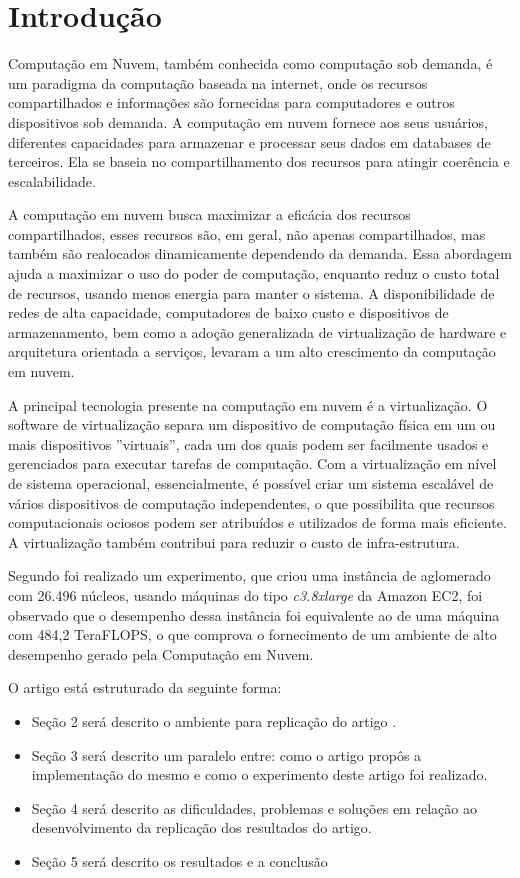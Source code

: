 \section{Introdução}

Computação em Nuvem, também conhecida como computação sob demanda, é um paradigma da computação baseada na internet, onde os recursos compartilhados e informações são fornecidas para computadores e outros dispositivos sob demanda. A computação em nuvem fornece aos seus usuários, diferentes capacidades para armazenar e processar seus dados em databases de terceiros. Ela se baseia no compartilhamento dos recursos para atingir coerência e escalabilidade.

A computação em nuvem busca maximizar a eficácia dos recursos compartilhados, esses recursos são, em geral, não apenas compartilhados, mas também são realocados dinamicamente dependendo da demanda. Essa abordagem ajuda a maximizar o uso do poder de computação, enquanto reduz o custo total de recursos, usando menos energia para manter o sistema. A disponibilidade de redes de alta capacidade, computadores de baixo custo e dispositivos de armazenamento, bem como a adoção generalizada de virtualização de hardware e arquitetura orientada a serviços, levaram a um alto crescimento da computação em nuvem.

A principal tecnologia presente na computação em nuvem é a virtualização. O software de virtualização separa um dispositivo de computação física em um ou mais dispositivos ''virtuais'', cada um dos quais podem ser facilmente usados e gerenciados para executar tarefas de computação. Com a virtualização em nível de sistema operacional, essencialmente, é possível criar um sistema escalável de vários dispositivos de computação independentes, o que possibilita que recursos computacionais ociosos podem ser atribuídos e utilizados de forma mais eficiente. A virtualização também contribui para reduzir o custo de infra-estrutura.

Segundo \cite{elaine_et_al:14} foi realizado um experimento, que criou uma instância de aglomerado com 26.496 núcleos, usando máquinas do tipo \textit{c3.8xlarge} da Amazon EC2, foi observado que o desempenho dessa instância foi equivalente ao de uma máquina com 484,2 TeraFLOPS, o que comprova o fornecimento de um ambiente de alto desempenho gerado pela Computação em Nuvem.

O artigo está estruturado da seguinte forma:
\begin{itemize}
  \item Seção 2 será descrito o ambiente para replicação do artigo \cite{elaine_et_al:14}.
  \item Seção 3 será descrito um paralelo entre: como o artigo propôs a implementação do mesmo e como o experimento deste artigo foi realizado.
  \item Seção 4 será descrito as dificuldades, problemas e soluções em relação ao desenvolvimento da replicação dos resultados do artigo.
  \item Seção 5 será descrito os resultados e a conclusão
\end{itemize}
